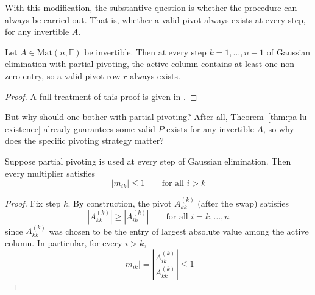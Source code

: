 		\noindent With this modification, the substantive question is whether the procedure can always be carried out. That is, whether a valid pivot always exists at every step, for any invertible $A$.
		
		\begin{proposition}
			\label{prop:partial-pivoting-exists}
			Let $A \in \mathrm{Mat}(n,\mathbb{F})$ be invertible. Then at every step $k=1,\dots,n-1$ of Gaussian elimination with partial pivoting, the active column contains at least one non-zero entry, so a valid pivot row $r$ always exists.
		\end{proposition}
		\begin{proof}
			A full treatment of this proof is given in \cite[\S3.4]{GolubVanLoan2013}.
		\end{proof}
		
		\noindent But why should one bother with partial pivoting? After all, Theorem~\ref{thm:pa-lu-existence} already guarantees some valid $P$ exists for any invertible $A$, so why does the specific pivoting strategy matter?
		
		\begin{proposition}
			\label{prop:bounded-multipliers}
			Suppose partial pivoting is used at every step of Gaussian elimination. Then every multiplier satisfies
			\[
				|m_{ik}| \le 1 \qquad \text{for all } i > k
			\]
		\end{proposition}
		\begin{proof}
			Fix step $k$. By construction, the pivot $A^{(k)}_{kk}$ (after the swap) satisfies
			\[
				|A^{(k)}_{kk}| \ge |A^{(k)}_{ik}| \qquad \text{for 	all } i = k, \dots, n
			\]
			since $A^{(k)}_{kk}$ was chosen to be the entry of largest absolute value among the active column. In particular, for every $i > k$,
			\[
				|m_{ik}| = 	\left|\frac{A^{(k)}_{ik}}{A^{(k)}_{kk}}\right| \le 1
			\]
		\end{proof}
		

